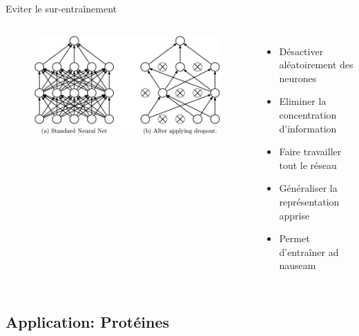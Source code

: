 \documentclass{beamer}
\begin{document}
\begin{frame}{Eviter le sur-entraînement}

  \begin{columns}
    \begin{figure}
      \centering
      \includegraphics[scale=0.3]{../Figures/dropout}
    \end{figure}

    \begin{itemize}
    \item Désactiver aléatoirement des neurones\pause
    \item Eliminer la concentration d'information\pause
    \item Faire travailler tout le réseau\pause
    \item Généraliser la représentation apprise\pause
    \item Permet d'entraîner ad nauseam
    \end{itemize}
  \end{columns}
\end{frame}

\subsection{Application: Protéines}
\end{document}
